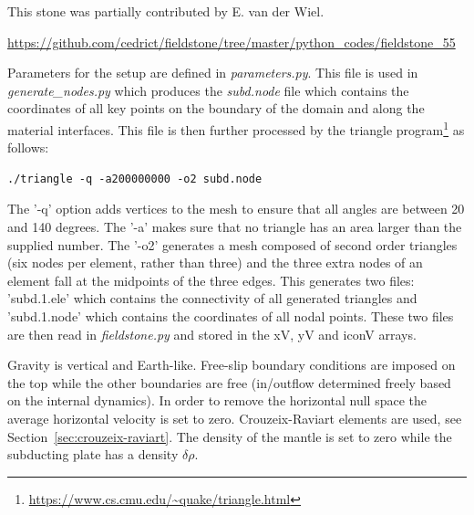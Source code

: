 \begin{mdframed}[backgroundcolor=red!5]
This stone was partially contributed by E. van der Wiel.
\end{mdframed}

\url{https://github.com/cedrict/fieldstone/tree/master/python_codes/fieldstone_55}

\vspace{1cm}

Parameters for the setup are defined in {\sl parameters.py}.
This file is used in {\sl generate\_nodes.py} which produces the
{\sl subd.node} file which contains the coordinates of all key points 
on the boundary of the domain and along the material interfaces.
This file is then further processed by the triangle 
program\footnote{\url{https://www.cs.cmu.edu/~quake/triangle.html}}
as follows:
\begin{verbatim}
./triangle -q -a200000000 -o2 subd.node
\end{verbatim}
The '-q' option adds vertices to the mesh to
ensure that all angles are between 20 and 140 degrees. 
The '-a' makes sure that no triangle has an area larger than 
the supplied number. The '-o2' generates a mesh composed 
of second order triangles (six nodes per element, rather than three) and the
three extra nodes of an element fall at the midpoints of the three edges.
This generates two files: 'subd.1.ele' which contains the connectivity 
of all generated triangles and 'subd.1.node' which contains the coordinates
of all nodal points. 
These two files are then read in {\sl fieldstone.py} and stored in the xV, yV and iconV arrays.

Gravity is vertical and Earth-like. Free-slip boundary conditions are imposed on the top while 
the other boundaries are free (in/outflow determined freely based on the internal dynamics). 
In order to remove the horizontal null space the average horizontal velocity is set to zero. 
Crouzeix-Raviart elements are used, see Section~\ref{sec:crouzeix-raviart}.
The density of the mantle is set to zero while the subducting plate has a density $\delta\rho$. 


